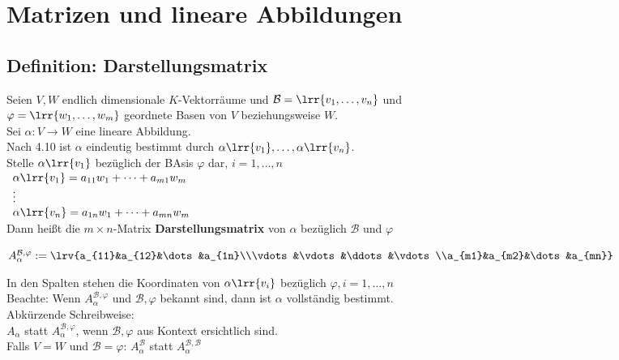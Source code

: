 \newpage
\section{Matrizen und lineare Abbildungen}
\subsection{Definition: Darstellungsmatrix}
	Seien $V,W$ endlich dimensionale $K$-Vektorräume und $\mathcal{B}=\lrr{v_1,\dots,v_n}$ und\\
	$\varphi=\lrr{w_1,\dots,w_m}$ geordnete Basen von $V$ beziehungsweise $W$.\\
	Sei $\alpha: V\rightarrow W$ eine lineare Abbildung.\\
	Nach 4.10 ist $\alpha$ eindeutig bestimmt durch $\alpha\lrr{v_1},\dots,\alpha\lrr{v_n}$.\\
	Stelle $\alpha\lrr{v_1}$ bezüglich der BAsis $\varphi$ dar, $i=1,\dots,n$\\
	$\begin{array}{l}
		\alpha\lrr{v_1}=a_{11}w_1+\dots+a_{m1}w_m\\
		\vdots\\
		\alpha\lrr{v_n}=a_{1n}w_1+\dots+a_{mn}w_m
	\end{array}$\\
	Dann heißt die $m\times n$-Matrix \textbf{Darstellungsmatrix} von $\alpha$ bezüglich $\mathcal{B}$ und $\varphi$

	$A_{\alpha}^{\mathcal{B}, \varphi}:=\lrv{a_{11}&a_{12}&\dots&a_{1n}\\\vdots&\vdots&\ddots&\vdots\\a_{m1}&a_{m2}&\dots&a_{mn}}$

	In den Spalten stehen die Koordinaten von $\alpha\lrr{v_i}$ bezüglich $\varphi, i=1,\dots,n$\\
	Beachte: Wenn $A_{\alpha}^{\mathcal{B}, \varphi}$ und $\mathcal{B},\varphi$ bekannt sind, dann ist $\alpha$ vollständig bestimmt.\\
	Abkürzende Schreibweise:\\
	$A_\alpha$ statt $A_{\alpha}^{\mathcal{B}, \varphi}$, wenn $\mathcal{B},\varphi$ aus Kontext ersichtlich sind.\\
	Falls $V=W$ und $\mathcal{B}=\varphi$: $A_{\alpha}^{\mathcal{B}}$ statt $A_{\alpha}^{\mathcal{B}, \mathcal{B}}$

